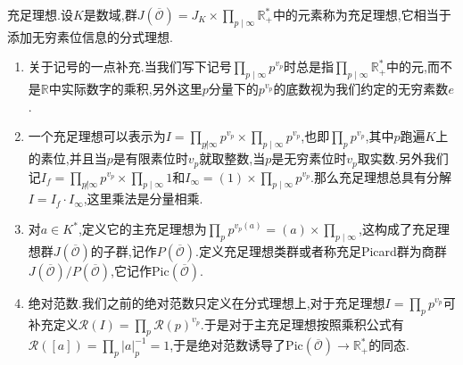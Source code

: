 充足理想.设$K$是数域,群$J(\overline{\mathscr{O}})=J_K\times\prod_{p\mid\infty}\mathbb{R}_+^*$中的元素称为充足理想,它相当于添加无穷素位信息的分式理想.
\begin{enumerate}
	\item 关于记号的一点补充.当我们写下记号$\prod_{p\mid\infty}p^{v_p}$时总是指$\prod_{p\mid\infty}\mathbb{R}_+^*$中的元,而不是$\mathbb{R}$中实际数字的乘积,另外这里$p$分量下的$p^{v_p}$的底数视为我们约定的无穷素数$e$.
	\item 一个充足理想可以表示为$I=\prod_{p\not|\infty}p^{v_p}\times\prod_{p\mid\infty}p^{v_p}$,也即$\prod_{p}p^{v_p}$,其中$p$跑遍$K$上的素位,并且当$p$是有限素位时$v_p$就取整数,当$p$是无穷素位时$v_p$取实数.另外我们记$I_f=\prod_{p\not|\infty}p^{v_p}\times\prod_{p\mid\infty}1$和$I_{\infty}=(1)\times\prod_{p\mid\infty}p^{v_p}$.那么充足理想总具有分解$I=I_f\cdot I_{\infty}$,这里乘法是分量相乘.
	\item 对$a\in K^*$,定义它的主充足理想为$\prod_{p}p^{v_p(a)}=(a)\times\prod_{p\mid\infty}$,这构成了充足理想群$J(\overline{\mathscr{O}})$的子群,记作$P(\overline{\mathscr{O}})$.定义充足理想类群或者称充足Picard群为商群$J(\overline{\mathscr{O}})/P(\overline{\mathscr{O}})$,它记作$\mathrm{Pic}(\overline{\mathscr{O}})$.
	\item 绝对范数.我们之前的绝对范数只定义在分式理想上,对于充足理想$I=\prod_pp^{v_p}$可补充定义$\mathscr{R}(I)=\prod_p\mathscr{R}(p)^{v_p}$.于是对于主充足理想按照乘积公式有$\mathscr{R}([a])=\prod_p|a|_p^{-1}=1$,于是绝对范数诱导了$\mathrm{Pic}(\overline{\mathscr{O}})\to\mathbb{R}_+^*$的同态.
\end{enumerate}

